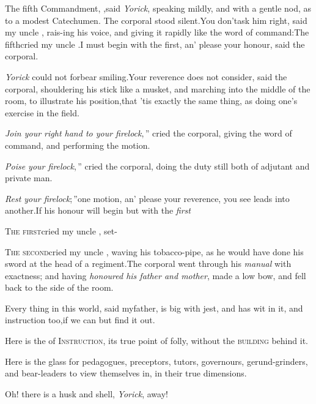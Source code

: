 \documentclass[twoside]{article}
\begin{document}
\tsk The fifth Commandment, \trim,\tsk said \textit{Yorick},
speaking mildly, and with a gentle nod, as to a modest Catechumen. The
corporal stood silent.\tsk You don’t\break ask him right, said my uncle
\toby, rais-\break ing his voice, and giving it rapidly like the word of
command:\tsh The fifth\break\tsh\tsh cried my uncle \toby.\tsk I must
begin with the first, an’ please your honour, said the corporal.\tsh


\tsk \textit{Yorick} could not forbear smiling.\break\tsk Your
reverence does not consider, said the corporal, shouldering his
stick like a musket, and marching into the middle of the room, to
illustrate his position,\break\tsk that ’tis exactly the same
thing, as doing one’s exercise in the field.\tsk

\indent\lqq\textit{Join your right hand to your firelock},\,”
cried the corporal, giving the word of command, and performing the
motion.\tsk

\indent\lqq\textit{Poise your firelock},\,” cried the corporal,
doing the duty still both of adjutant and private man.\tsk

\indent\lqq\textit{Rest your firelock};\,”\tsk one motion,
an’ please your reverence, you see leads into
another.\tsk If his honour will begin but with the
\textit{first}\tsk

\textsc{The first}\tsk cried my uncle \toby,
set-\break
{}

\textsc{The second}\tsk cried my uncle \toby,
waving his tobacco-pipe, as he would have done his sword at the
head of a regiment.\tsk The corporal went through his
\textit{manual} with exactness; and having \textit{honoured his father and
mother}, made a low bow, and fell back to the side of the\break
room.

Every thing in this world, said my\break father, is big with jest, and
has wit in it, and instruction too,\tsk if we can but find it
out.


\tsk Here is the  of
\textsc{Instruction}, its true point of folly, without the
\textsc{building} behind it.


\tsk Here is the glass for pedagogues, preceptors, tutors,
governours, gerund-\break grinders, and bear-leaders to view themselves in,
in their true dimensions.\tsk{}

Oh! there is a husk and shell,
\textit{Yorick},\break
{}
away!
\end{document}
